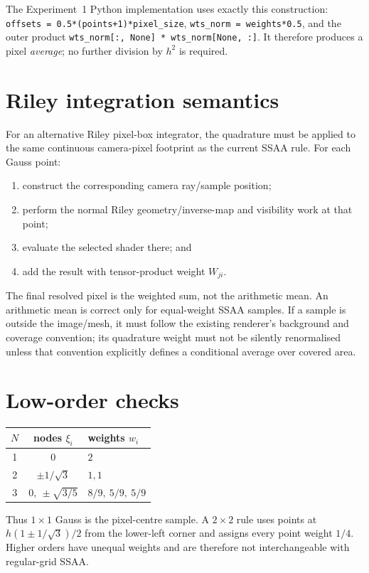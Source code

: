 \documentclass[11pt,a4paper]{article}
\begin{document}
\noindent The Experiment~1 Python implementation uses exactly this
construction: \texttt{offsets = 0.5*(points+1)*pixel\_size},
\texttt{wts\_norm = weights*0.5}, and the outer product
\texttt{wts\_norm[:, None] * wts\_norm[None, :]}.  It therefore produces a
pixel \emph{average}; no further division by \(h^2\) is required.

\section{Riley integration semantics}

For an alternative Riley pixel-box integrator, the quadrature must be applied
to the same continuous camera-pixel footprint as the current SSAA rule.
For each Gauss point:
\begin{enumerate}
    \item construct the corresponding camera ray/sample position;
    \item perform the normal Riley geometry/inverse-map and visibility work
          at that point;
    \item evaluate the selected shader there; and
    \item add the result with tensor-product weight \(W_{ji}\).
\end{enumerate}
The final resolved pixel is the weighted sum, not the arithmetic mean.  An
arithmetic mean is correct only for equal-weight SSAA samples.  If a sample is
outside the image/mesh, it must follow the existing renderer's background and
coverage convention; its quadrature weight must not be silently renormalised
unless that convention explicitly defines a conditional average over covered
area.

\section{Low-order checks}

\begin{center}
\begin{tabular}{ccl}
\toprule
\(N\) & nodes \(\xi_i\) & weights \(w_i\) \\
\midrule
1 & \(0\) & \(2\) \\
2 & \(\pm1/\sqrt{3}\) & \(1,1\) \\
3 & \(0,\ \pm\sqrt{3/5}\) & \(8/9,\ 5/9,\ 5/9\) \\
\bottomrule
\end{tabular}
\end{center}

Thus \(1\times1\) Gauss is the pixel-centre sample.  A \(2\times2\) rule uses
points at \(h(1\pm1/\sqrt3)/2\) from the lower-left corner and assigns every
point weight \(1/4\).  Higher orders have unequal weights and are therefore
not interchangeable with regular-grid SSAA.
\end{document}

